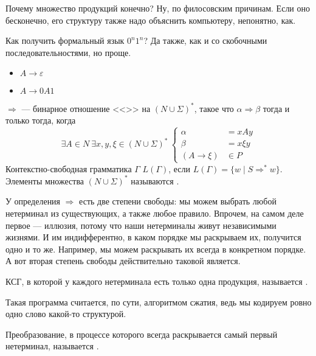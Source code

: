 \documentclass{article}
\begin{document}
\begin{itemize}
\begin{Comment}
            Почему множество продукций конечно? Ну, по филосовским причинам. Если оно бесконечно, его структуру также надо объяснить компьютеру, непонятно, как.
        \end{Comment}
        \begin{Example}
            Как получить формальный язык $0^n1^n$? Да также, как и со скобочными последовательностями, но проще.
            \begin{itemize}
                \item $A\to\varepsilon$
                \item $A\to0A1$
            \end{itemize}
        \end{Example}
        \dfn $\Rightarrow$ --- бинарное отношение <<>> на $(N\cup\Sigma)^*$, такое что $\alpha\Rightarrow\beta$ тогда и только тогда, когда
        $$
        \exists A\in N~\exists x,y,\xi\in(N\cup\Sigma)^*~\left\{\begin{aligned}
            \alpha&=xAy\\
            \beta&=x\xi y\\
            (A\to\xi)&\in P
        \end{aligned}\right.
        $$
        \dfn Контекстно-свободная грамматика $\Gamma$  $L(\Gamma)$, если $L(\Gamma)=\{w\mid S\Rightarrow^*w\}$.
        \dfn Элементы множества $(N\cup\Sigma)^*$ называются .
        \begin{Comment}
            У определения $\Rightarrow$ есть две степени свободы: мы можем выбрать любой нетерминал из существующих, а также любое правило. Впрочем, на самом деле первое --- иллюзия, потому что наши нетерминалы живут независимыми жизнями. И им индифферентно, в каком порядке мы раскрываем их, получится одно и то же. Например, мы можем раскрывать их всегда в конкретном порядке. А вот вторая степень свободы действительно таковой является.
        \end{Comment}
        \dfn КСГ, в которой у каждого нетерминала есть только одна продукция, называется .
        \begin{Comment}
            Такая программа считается, по сути, алгоритмом сжатия, ведь мы кодируем ровно одно слово какой-то структурой.
        \end{Comment}
        \dfn Преобразование, в процессе которого всегда раскрывается самый первый нетерминал, называется .

\end{itemize}
\end{document}
